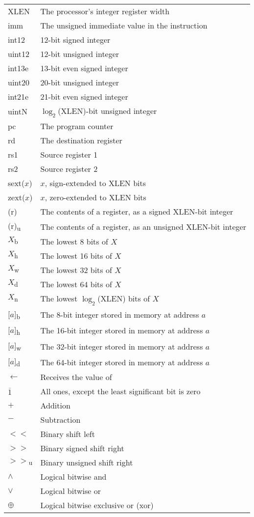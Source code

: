 \documentclass[11pt,twoside,letterpaper,titlepage]{report}
\begin{document}
\begin{center}\begin{longtable}{ll}
XLEN & The processor's integer register width \\
imm & The unsigned immediate value in the instruction \\
int12 & 12-bit signed integer \\
uint12 & 12-bit unsigned integer \\
int13e & 13-bit even signed integer \\
uint20 & 20-bit unsigned integer \\
int21e & 21-bit even signed integer \\
uintN & $\log_2$(XLEN)-bit unsigned integer \\
pc & The program counter \\
rd & The destination register \\
rs1 & Source register 1 \\
rs2 & Source register 2 \\
sext($x$) & $x$, sign-extended to XLEN bits \\
zext($x$) & $x$, zero-extended to XLEN bits \\
(r) & The contents of a register, as a signed XLEN-bit integer\\
(r)\textsubscript{u} & The contents of a register, as an unsigned XLEN-bit integer\\
$X$\textsubscript{b} & The lowest 8 bits of $X$\\
$X$\textsubscript{h} & The lowest 16 bits of $X$\\
$X$\textsubscript{w} & The lowest 32 bits of $X$\\
$X$\textsubscript{d} & The lowest 64 bits of $X$\\
$X$\textsubscript{n} & The lowest $\log_2$(XLEN) bits of $X$\\
{[}$a${]}\textsubscript{b} & The 8-bit integer stored in memory at address $a$\\
{[}$a${]}\textsubscript{h} & The 16-bit integer stored in memory at address $a$\\
{[}$a${]}\textsubscript{w} & The 32-bit integer stored in memory at address $a$\\
{[}$a${]}\textsubscript{d} & The 64-bit integer stored in memory at address $a$\\
$\leftarrow$ & Receives the value of \\
$\overline{1}$ & All ones, except the least significant bit is zero\\
$+$ & Addition \\
$-$ & Subtraction \\
$<<$ & Binary shift left \\
$>>$ & Binary signed shift right \\
$>>$\textsubscript{u} & Binary unsigned shift right \\
$\land$ & Logical bitwise and \\
$\lor$ & Logical bitwise or \\
$\oplus$ & Logical bitwise exclusive or (xor)

\end{longtable}\end{center}
\end{document}
